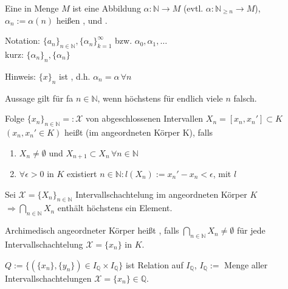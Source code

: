 \begin{*definition}[Folge]
    Eine  in Menge $M$ ist eine Abbildung $\alpha:\mathbb{N}\rightarrow M$ (evtl. $\alpha:\mathbb{N}_{\ge n}\rightarrow M$), $\alpha_n := \alpha(n)$ heißen , und .
    
	Notation: $\{a_n\}_{n\in\mathbb{N}}, \{\alpha_n\}_{k=1}^\infty$ bzw. $\alpha_0, \alpha_1, \dotsc$\\
	kurz: $\{\alpha_n\}_n, \{\alpha_n \}$
		
	Hinweis: $\{x\}_n$ ist , d.h. $\alpha_n = \alpha\,\forall n$
\end{*definition}

Aussage gilt für \gls{fa} $n\in\mathbb{N}$, wenn höchstens für endlich viele $n$ falsch.

\begin{*definition}[Intervallschachtelung]
	Folge $\{x_n\}_{n\in\mathbb{N}} =:\mathcal{X}$ von abgeschlossenen Intervallen $X_n=[x_n, x_n']\subset K$ $(x_n, x_n'\in K)$ heißt  (im angeordneten Körper K), falls
	\begin{enumerate}[label={\alph*)}]
		\item $X_n\neq \emptyset$ und $X_{n+1}\subset X_n\,\forall n\in\mathbb{N}$
		\item $\forall\epsilon > 0$ in $K$ existiert $n\in\mathbb{N}: l(X_n):= x_n' - x_n < \epsilon$, mit $l$ 
	\end{enumerate}
\end{*definition}

\begin{lemma}
	Sei $\mathcal{X} = \{X_n\}_{n\in\mathbb{N}}$ Intervallschachtelung im angeordneten Körper $K$\\
	$\Rightarrow \bigcap_{n\in\mathbb{N}} X_n$ enthält höchstens ein Element.
\end{lemma}

\begin{*definition}
	Archimedisch angeordneter Körper heißt , falls $\bigcap_{n\in\mathbb{N}} X_n\neq \emptyset$ für jede Intervallschachtelung $\mathcal{X} = \{x_n\}$ in $K$.
\end{*definition}

\begin{*definition}
	$Q:=\{ (\{x_n\}, \{y_n\})\in I_\mathbb{Q}\times I_\mathbb{Q} \}$ ist Relation auf $I_\mathbb{Q}$, $I_\mathbb{Q}:=$ Menge aller Intervallschachtelungen $\mathcal{X}=\{x_n\} \in \mathbb{Q}$.
\end{*definition}

